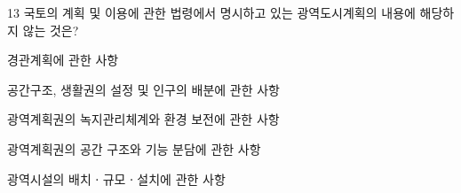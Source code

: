 \begin{question}{13}
국토의 계획 및 이용에 관한 법령에서 명시하고 있는 광역도시계획의 내용에 해당하지 않는 것은?
\begin{choices}
  \item 경관계획에 관한 사항
  \item 공간구조, 생활권의 설정 및 인구의 배분에 관한 사항
  \item 광역계획권의 녹지관리체계와 환경 보전에 관한 사항
  \item 광역계획권의 공간 구조와 기능 분담에 관한 사항
  \item 광역시설의 배치ㆍ규모ㆍ설치에 관한 사항
\end{choices}
\end{question}

